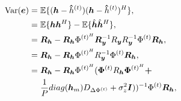 \documentclass[journal]{IEEEtran}
\begin{document}
\begin{equation}
\begin{split}
\text{Var}(\boldsymbol{e}) = \hspace{0.3em}& \mathbb{E}\{ (\boldsymbol{h} - \boldsymbol{\hat}{h}^{(t)})(\boldsymbol{h} - \boldsymbol{\hat}{h}^{(t)})^H \}, \\
=\hspace{0.3em}& \mathbb{E}\{\boldsymbol{h} \boldsymbol{h}^H\} - \mathbb{E}\{\hat{\boldsymbol{h}}\hat{\boldsymbol{h}}^H\}, \\
=\hspace{0.3em}& \boldsymbol{R}_{\boldsymbol{h}} - \boldsymbol{R}_{\boldsymbol{h}}\Phi^{(t)^H}\boldsymbol{R}_{\boldsymbol{y}}^{-1}R_{\boldsymbol{y}}R_{\boldsymbol{y}}^{-1}\Phi^{(t)}\boldsymbol{R}_{\boldsymbol{h}}, \\
=\hspace{0.3em}& \boldsymbol{R}_{\boldsymbol{h}} - \boldsymbol{R}_{\boldsymbol{h}}\Phi^{(t)^H}R_{\boldsymbol{y}}^{-1}\Phi^{(t)}\boldsymbol{R}_{\boldsymbol{h}}, \\
=\hspace{0.3em}& \boldsymbol{R}_{\boldsymbol{h}} - \boldsymbol{R}_{\boldsymbol{h}}\Phi^{(t)^H} (\boldsymbol{\Phi}^{(t)} R_{\boldsymbol{h}} \boldsymbol{\Phi}^{(t)^{H}}\boldsymbol{+} \\
\hspace{0.3em}& \frac{1}{P} diag(\boldsymbol{h}_m) D_{\Delta \Phi^{(t)}} +\sigma_z^2\boldsymbol{I}))^{-1} \Phi^{(t)}\boldsymbol{R}_{\boldsymbol{h}}, \\
\end{split}
\end{equation}




{\renewcommand{\baselinestretch}{1.1}
\begin{footnotesize}


\end{footnotesize}}
\end{document}
